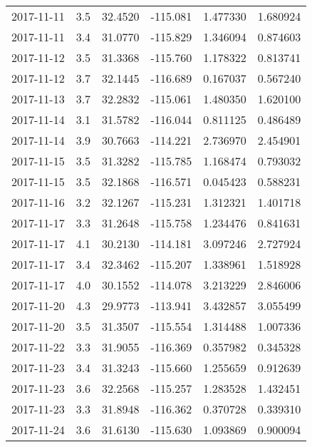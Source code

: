 \begin{tabular}{lrrrrr}
2017-11-11 &       3.5 &  32.4520 &  -115.081 &         1.477330 &         1.680924 \\
2017-11-11 &       3.4 &  31.0770 &  -115.829 &         1.346094 &         0.874603 \\
2017-11-12 &       3.5 &  31.3368 &  -115.760 &         1.178322 &         0.813741 \\
2017-11-12 &       3.7 &  32.1445 &  -116.689 &         0.167037 &         0.567240 \\
2017-11-13 &       3.7 &  32.2832 &  -115.061 &         1.480350 &         1.620100 \\
2017-11-14 &       3.1 &  31.5782 &  -116.044 &         0.811125 &         0.486489 \\
2017-11-14 &       3.9 &  30.7663 &  -114.221 &         2.736970 &         2.454901 \\
2017-11-15 &       3.5 &  31.3282 &  -115.785 &         1.168474 &         0.793032 \\
2017-11-15 &       3.5 &  32.1868 &  -116.571 &         0.045423 &         0.588231 \\
2017-11-16 &       3.2 &  32.1267 &  -115.231 &         1.312321 &         1.401718 \\
2017-11-17 &       3.3 &  31.2648 &  -115.758 &         1.234476 &         0.841631 \\
2017-11-17 &       4.1 &  30.2130 &  -114.181 &         3.097246 &         2.727924 \\
2017-11-17 &       3.4 &  32.3462 &  -115.207 &         1.338961 &         1.518928 \\
2017-11-17 &       4.0 &  30.1552 &  -114.078 &         3.213229 &         2.846006 \\
2017-11-20 &       4.3 &  29.9773 &  -113.941 &         3.432857 &         3.055499 \\
2017-11-20 &       3.5 &  31.3507 &  -115.554 &         1.314488 &         1.007336 \\
2017-11-22 &       3.3 &  31.9055 &  -116.369 &         0.357982 &         0.345328 \\
2017-11-23 &       3.4 &  31.3243 &  -115.660 &         1.255659 &         0.912639 \\
2017-11-23 &       3.6 &  32.2568 &  -115.257 &         1.283528 &         1.432451 \\
2017-11-23 &       3.3 &  31.8948 &  -116.362 &         0.370728 &         0.339310 \\
2017-11-24 &       3.6 &  31.6130 &  -115.630 &         1.093869 &         0.900094 \\

\end{tabular}
